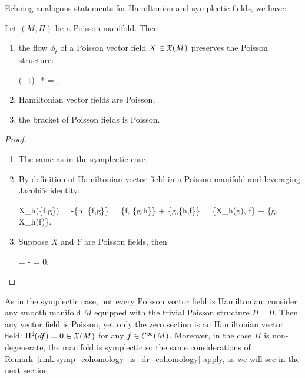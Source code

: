 \documentclass[main.tex]{subfiles}
\begin{document}
Echoing analogous statements for Hamiltonian and symplectic fields, we have:

\begin{theorem}
	Let $(M,\Pi)$ be a Poisson manifold. Then
	\begin{enumerate}
		\item the flow $\phi_t$ of a Poisson vector field $X \in \mathfrak{X}(M)$ preserves the Poisson structure:
		\begin{eqalign}
			(\phi_t)_* \Pi = \Pi,
		\end{eqalign}
		\item Hamiltonian vector fields are Poisson,
		\item the bracket of Poisson fields is Poisson.
	\end{enumerate}
\end{theorem}
\begin{proof}
	\leavevmode
	\begin{enumerate}
		\item The same as in the symplectic case.
		\item By definition of Hamiltonian vector field in a Poisson manifold and leveraging Jacobi's identity:
		\begin{eqalign}
			X_h(\{f,g\}) = -\{h, \{f,g\}\} = \{f, \{g,h\}\} + \{g,\{h,f\}\} = \{X_h(g), f\} + \{g, X_h(f)\}.
		\end{eqalign}
		\item Suppose $X$ and $Y$ are Poisson fields, then
		\begin{eqalign}
			\Lie{[X,Y]}\Pi = \Lie{Y}\Pi - \Pi = 0.
		\end{eqalign}
	\end{enumerate}
\end{proof}

\begin{remark}
	As in the symplectic case, not every Poisson vector field is Hamiltonian: consider any smooth manifold $M$ equipped with the trivial Poisson structure $\Pi=0$. Then any vector field is Poisson, yet only the zero section is an Hamiltonian vector field: $\Pi^\sharp(df) = 0 \in \mathfrak{X}(M)$ for any $f \in \mathcal{C}^\infty(M)$. Moreover, in the case $\Pi$ is non-degenerate, the manifold is symplectic so the same considerations of Remark~\ref{rmk:symp_cohomology_is_dr_cohomology} apply, as we will see in the next section.
\end{remark}

\end{document}

